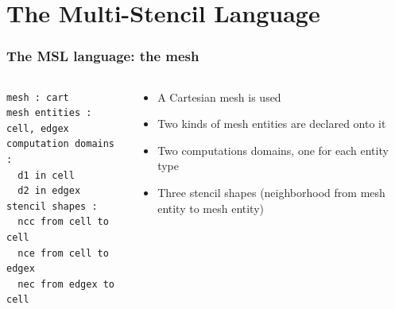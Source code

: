 \documentclass{beamer}
\begin{document}
\section{The Multi-Stencil Language}
\begin{frame}[fragile]
\frametitle{The MSL language: the mesh}
\begin{center}
\end{center}
\begin{columns}
\begin{column}{6.5cm}
  \begin{lstlisting}[frame=single]
mesh : cart
mesh entities : cell, edgex
computation domains :
  d1 in cell
  d2 in edgex
stencil shapes : 
  ncc from cell to cell
  nce from cell to edgex
  nec from edgex to cell
\end{lstlisting}
\end{column}
\begin{column}{5.5cm}
\begin{itemize}
\item A Cartesian mesh is used
\item Two kinds of mesh entities are declared onto it
\item Two computations domains, one for each entity type
\item Three stencil shapes (neighborhood from mesh entity to mesh entity)
\end{itemize}
\end{column}
\end{columns}
\end{frame}
\end{document}
